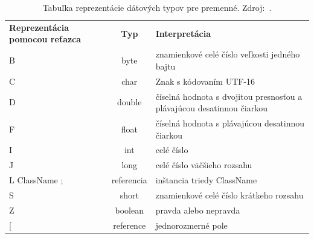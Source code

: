 \documentclass[11pt,final,oneside]{fithesis}
\begin{document}
\begin{table}
  \begin{tabular}{| p{3cm} | c | p{} |}
    \hline
    \textbf{Reprezentácia pomocou reťazca} & \textbf{Typ} & 
    \textbf{Interpretácia} \\
    \hhline{|=|=|=|}
     B & byte &  znamienkové celé číslo veľkosti jedného bajtu \\ \hline
     C & char & Znak s kódovaním UTF-16 \\ \hline
     D & double & číselná hodnota s dvojitou presnosťou a plávajúcou
     desatinnou čiarkou \\ \hline
     F & float & číselná hodnota s plávajúcou desatinnou čiarkou \\ \hline
     I & int & celé číslo \\ \hline
     J & long & celé číslo väčšieho rozsahu \\ \hline
     L ClassName ; & referencia & inštancia triedy ClassName \\ \hline
     S & short & znamienkové celé číslo krátkeho rozsahu \\ \hline
     Z & boolean & pravda alebo nepravda \\ \hline
     [ & reference & jednorozmerné pole \\
    \hline
  \end{tabular}
  \caption{Tabuľka reprezentácie dátových typov pre premenné.
  Zdroj:~\cite{Lindholm:2013:JVM:2462629}.}
  \label{tab:tab3}
\end{table}
\end{document}
